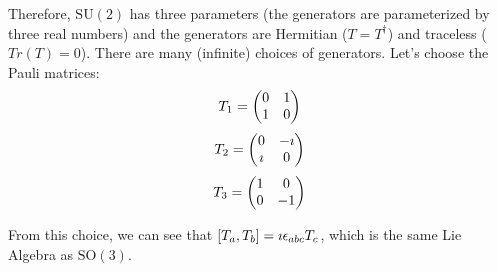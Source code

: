 \documentclass[a4paper,twoside,master.tex]{subfiles}
\begin{document}
Therefore, $ \text{SU}(2) $ has three parameters (the generators are parameterized by three real numbers) and the generators are Hermitian ($ T = T^\dagger $) and traceless ($ Tr(T) = 0 $). There are many (infinite) choices of generators. Let's choose the Pauli matrices:
\begin{equation}
    T_1 = \mqty(0&1\\1&0)
\end{equation}
\begin{equation}
    T_2 = \mqty(0&- \imath \\ \imath &0)
\end{equation}
\begin{equation}
    T_3 = \mqty(1&0\\0&-1)
\end{equation}

From this choice, we can see that $ \comm{T_a}{T_b} = \imath \epsilon_{abc} T_c $, which is the same Lie Algebra as $ \text{SO}(3) $.
\end{document}
